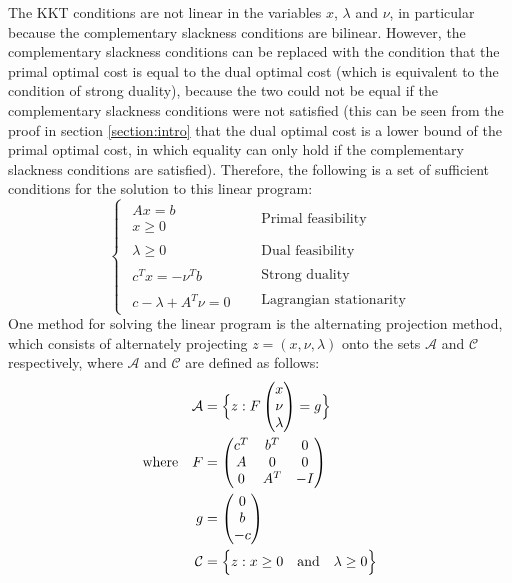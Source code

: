 The KKT conditions are not linear in the variables $x$, $\lambda$ and $\nu$, in particular because the complementary slackness conditions are bilinear. However, the complementary slackness conditions can be replaced with the condition that the primal optimal cost is equal to the dual optimal cost (which is equivalent to the condition of strong duality), because the two could not be equal if the complementary slackness conditions were not satisfied (this can be seen from the proof in section \ref{section:intro} that the dual optimal cost is a lower bound of the primal optimal cost, in which equality can only hold if the complementary slackness conditions are satisfied). Therefore, the following is a set of sufficient conditions for the solution to this linear program:
\begin{equation*}
    \begin{cases}
        \begin{array}{l} Ax = b \\ x \ge 0 \end{array} & \text{Primal feasibility} \\
        \begin{array}{l} \lambda \ge 0 \end{array} & \text{Dual feasibility} \\
        \begin{array}{l} c^Tx = -\nu^Tb \end{array} & \text{Strong duality} \\
        \begin{array}{l} c - \lambda + A^T\nu = 0 \end{array} \quad & \text{Lagrangian stationarity}
    \end{cases}
\end{equation*}
One method for solving the linear program is the alternating projection method, which consists of alternately projecting $z=(x,\nu,\lambda)$ onto the sets $\mathcal{A}$ and $\mathcal{C}$ respectively, where $\mathcal{A}$ and $\mathcal{C}$ are defined as follows:
\begin{align*}
    \mathcal{A} &= \Bigl\{ z: F \begin{pmatrix}
        x \\
        \nu \\
        \lambda
    \end{pmatrix} = g \Bigr\} \\
    \text{where} \quad F &= \begin{pmatrix}
        c^T & b^T & 0 \\
        A & 0 & 0 \\
        0 & A^T & -I
    \end{pmatrix} \\
    g &= \begin{pmatrix}
        0 \\
        b \\
        -c
    \end{pmatrix} \\
    \mathcal{C} &= \Bigl\{ z: x \ge 0 \quad \text{and} \quad \lambda \ge 0 \Bigr\}
\end{align*}
